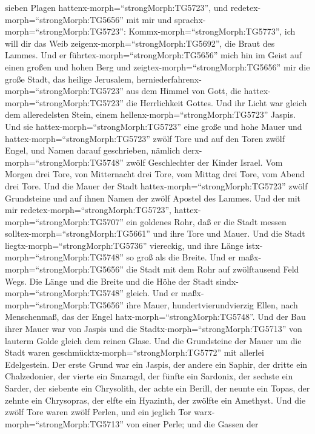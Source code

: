 sieben Plagen hattenx-morph=``strongMorph:TG5723'', und
redetex-morph=``strongMorph:TG5656'' mit mir und
sprachx-morph=``strongMorph:TG5723'':
Kommx-morph=``strongMorph:TG5773'', ich will dir das Weib
zeigenx-morph=``strongMorph:TG5692'', die Braut des Lammes.
 Und er führtex-morph=``strongMorph:TG5656'' mich hin im
Geist auf einen großen und hohen Berg und
zeigtex-morph=``strongMorph:TG5656'' mir die große Stadt, das heilige
Jerusalem, herniederfahrenx-morph=``strongMorph:TG5723'' aus dem Himmel
von Gott,  die hattex-morph=``strongMorph:TG5723'' die
Herrlichkeit Gottes. Und ihr Licht war gleich dem alleredelsten Stein,
einem hellenx-morph=``strongMorph:TG5723'' Jaspis.  Und sie
hattex-morph=``strongMorph:TG5723'' eine große und hohe Mauer und
hattex-morph=``strongMorph:TG5723'' zwölf Tore und auf den Toren zwölf
Engel, und Namen darauf geschrieben, nämlich
derx-morph=``strongMorph:TG5748'' zwölf Geschlechter der Kinder Israel.
 Vom Morgen drei Tore, von Mitternacht drei Tore, vom
Mittag drei Tore, vom Abend drei Tore.  Und die Mauer der
Stadt hattex-morph=``strongMorph:TG5723'' zwölf Grundsteine und auf
ihnen Namen der zwölf Apostel des Lammes.  Und der mit mir
redetex-morph=``strongMorph:TG5723'',
hattex-morph=``strongMorph:TG5707'' ein goldenes Rohr, daß er die Stadt
messen solltex-morph=``strongMorph:TG5661'' und ihre Tore und Mauer.
 Und die Stadt liegtx-morph=``strongMorph:TG5736''
viereckig, und ihre Länge istx-morph=``strongMorph:TG5748'' so groß als
die Breite. Und er maßx-morph=``strongMorph:TG5656'' die Stadt mit dem
Rohr auf zwölftausend Feld Wegs. Die Länge und die Breite und die Höhe
der Stadt sindx-morph=``strongMorph:TG5748'' gleich.  Und
er maßx-morph=``strongMorph:TG5656'' ihre Mauer, hundertvierundvierzig
Ellen, nach Menschenmaß, das der Engel
hatx-morph=``strongMorph:TG5748''.  Und der Bau ihrer Mauer
war von Jaspis und die Stadtx-morph=``strongMorph:TG5713'' von lauterm
Golde gleich dem reinen Glase.  Und die Grundsteine der
Mauer um die Stadt waren geschmücktx-morph=``strongMorph:TG5772'' mit
allerlei Edelgestein. Der erste Grund war ein Jaspis, der andere ein
Saphir, der dritte ein Chalzedonier, der vierte ein Smaragd,
 der fünfte ein Sardonix, der sechste ein Sarder, der
siebente ein Chrysolith, der achte ein Berill, der neunte ein Topas, der
zehnte ein Chrysopras, der elfte ein Hyazinth, der zwölfte ein Amethyst.
 Und die zwölf Tore waren zwölf Perlen, und ein jeglich Tor
warx-morph=``strongMorph:TG5713'' von einer Perle; und die Gassen der
